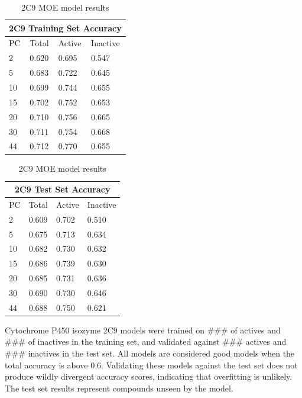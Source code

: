 \begin{table}[!h]
\begin{minipage}{.5\linewidth}
\centering
\begin{tabular}{|l|l|l|l|}
\hline
\multicolumn{4}{|c|}{2C9 Training Set Accuracy} \\ \hline
PC & Total          & Active          & Inactive\\ \hline
2  & 0.620          & 0.695           & 0.547   \\ \hline
5  & 0.683          & 0.722           & 0.645   \\ \hline
10 & 0.699          & 0.744           & 0.655   \\ \hline
15 & 0.702          & 0.752           & 0.653   \\ \hline
20 & 0.710          & 0.756           & 0.665   \\ \hline
30 & 0.711          & 0.754           & 0.668   \\ \hline
44 & 0.712          & 0.770           & 0.655   \\ \hline
\end{tabular}
\end{minipage}
\begin{minipage}{.5\linewidth}
\centering
\begin{tabular}{|l|l|l|l|}
\hline
\multicolumn{4}{|c|}{2C9 Test Set Accuracy}     \\ \hline
PC & Total          & Active          & Inactive\\ \hline
2  & 0.609          & 0.702           & 0.510   \\ \hline
5  & 0.675          & 0.713           & 0.634   \\ \hline
10 & 0.682          & 0.730           & 0.632   \\ \hline
15 & 0.686          & 0.739           & 0.630   \\ \hline
20 & 0.685          & 0.731           & 0.636   \\ \hline
30 & 0.690          & 0.730           & 0.646   \\ \hline
44 & 0.688          & 0.750           & 0.621   \\ \hline
\end{tabular}
\end{minipage}
\caption{2C9 MOE model results}
\end{table}

Cytochrome P450 isozyme 2C9 models were trained on ### of actives and ### of inactives in the training set, and validated against ### actives and ### inactives in the test set. All models are considered good models when the  total accuracy is above 0.6. Validating these models against the test set does not produce wildly divergent accuracy scores, indicating that overfitting is unlikely. The test set results represent compounds unseen by the model. 

